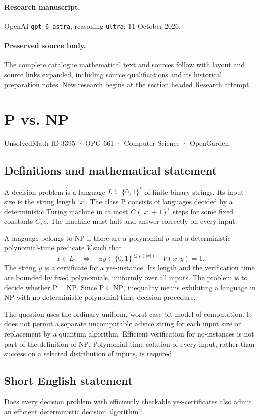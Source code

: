 \documentclass[11pt,a4paper]{article}
\begin{document}
\paragraph{Research manuscript.} OpenAI \texttt{gpt-6-astra}, reasoning \texttt{ultra}; 11 October 2026.
\paragraph{Preserved source body.} The complete catalogue mathematical text and sources follow with layout and source links expanded, including source qualifications and its historical preparation notes. New research begins at the section headed Research attempt.

\section*{P vs. NP}\label{3395}
{\small UnsolvedMath ID 3395 · OPG-661 · Computer Science · OpenGarden}
\subsection{Definitions and mathematical statement}
A decision problem is a language $L\subseteq\{0,1\}^*$ of finite
binary strings. Its input size is the string length $|x|$. The class
$\mathrm P$ consists of languages decided by a deterministic Turing
machine in at most $C(|x|+1)^c$ steps for some fixed constants $C,c$.
The machine must halt and answer correctly on every input.

A language belongs to $\mathrm{NP}$ if there are a polynomial $p$
and a deterministic polynomial-time predicate $V$ such that
\[
 x\in L\quad\Longleftrightarrow\quad
 \exists y\in\{0,1\}^{\le p(|x|)}\quad V(x,y)=1.
\]
The string $y$ is a certificate for a yes-instance. Its length and
the verification time are bounded by fixed polynomials, uniformly
over all inputs. The problem is to decide whether
$\mathrm P=\mathrm{NP}$. Since $\mathrm P\subseteq\mathrm{NP}$,
inequality means exhibiting a language in $\mathrm{NP}$ with no
deterministic polynomial-time decision procedure.

The question uses the ordinary uniform, worst-case bit model of
computation. It does not permit a separate uncomputable advice string
for each input size or replacement by a quantum algorithm. Efficient
verification for no-instances is not part of the definition of
$\mathrm{NP}$. Polynomial-time solution of every input, rather than
success on a selected distribution of inputs, is required.
\subsection{Short English statement}
Does every decision problem with efficiently checkable yes-certificates also admit an efficient deterministic decision algorithm?
\end{document}
